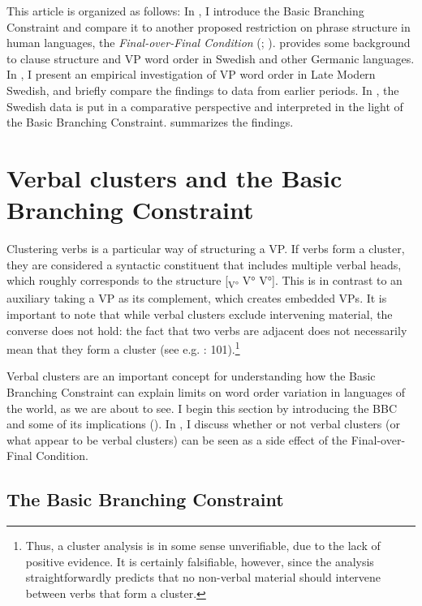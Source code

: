 \documentclass[output=paper, colorlinks, citecolor=brown]{langscibook}
\begin{document}
This article is organized as follows: In , I introduce the Basic Branching Constraint and compare it to another proposed restriction on phrase structure in human languages, the \textit{Final-over-Final Condition} (\citealt{BiberauerEtAl2014}; \citealt{SheehanEtAl2017}).  provides some background to clause structure and VP word order in Swedish and other Germanic languages. In , I present an empirical investigation of VP word order in Late Modern Swedish, and briefly compare the findings to data from earlier periods. In , the Swedish data is put in a comparative perspective and interpreted in the light of the Basic Branching Constraint.  summarizes the findings.


\section{Verbal clusters and the Basic Branching Constraint}\label{sec:sangfelt:2}

Clustering verbs is a particular way of structuring a VP. If verbs form a cluster, they are considered a syntactic constituent that includes multiple verbal heads, which roughly corresponds to the structure [\textsubscript{V°} V° V°]. This is in contrast to an auxiliary taking a VP as its complement, which creates embedded VPs. It is important to note that while verbal clusters exclude intervening material, the converse does not hold: the fact that two verbs are adjacent does not necessarily mean that they form a cluster (see e.g. \citealt{Sheehan2017Final}: 101).\footnote{Thus, a cluster analysis is in some sense unverifiable, due to the lack of positive evidence. It is certainly falsifiable, however, since the analysis straightforwardly predicts that no non-verbal material should intervene between verbs that form a cluster.}


Verbal clusters are an important concept for understanding how the Basic Branching Constraint can explain limits on word order variation in languages of the world, as we are about to see. I begin this section by introducing the BBC and some of its implications (). In , I discuss whether or not verbal clusters (or what appear to be verbal clusters) can be seen as a side effect of the Final-over-Final Condition.


\subsection{The Basic Branching Constraint}\label{sec:sangfelt:2.1}
\end{document}
